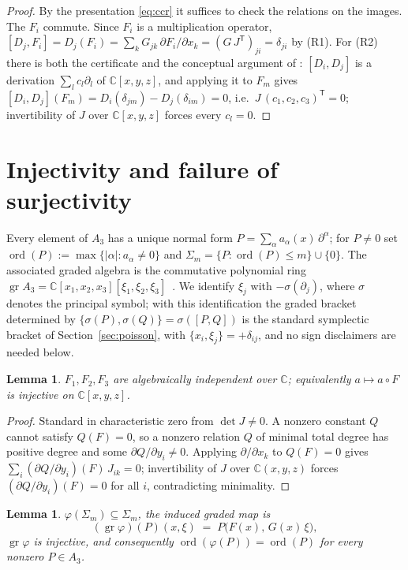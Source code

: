 \documentclass[11pt]{article}
\newtheorem{lemma}[theorem]{Lemma}
\theoremstyle{remark}
\newcommand{\C}{\mathbb{C}}
\newcommand{\A}{A_3}
\newcommand{\ord}{\operatorname{ord}}
\newcommand{\gr}{\operatorname{gr}}
\begin{document}
\begin{proof}
By the presentation \eqref{eq:ccr} it suffices to check the relations on
the images. The $F_i$ commute. Since $F_i$ is a multiplication operator,
$[D_j,F_i]=D_j(F_i)=\sum_k G_{jk}\,\partial F_i/\partial x_k=(G\,J^{\mathsf
T})_{ji}=\delta_{ji}$ by (R1). For (R2) there is both the certificate and
the conceptual argument of \cite[Prop.~3]{OP2026}: $[D_i,D_j]$ is a
derivation $\sum_l c_l\partial_l$ of $\C[x,y,z]$, and applying it to $F_m$
gives $[D_i,D_j](F_m)=D_i(\delta_{jm})-D_j(\delta_{im})=0$, i.e.\
$J\,(c_1,c_2,c_3)^{\mathsf T}=0$; invertibility of $J$ over $\C[x,y,z]$
forces every $c_l=0$.
\end{proof}

\section{Injectivity and failure of surjectivity}\label{sec:nonsurj}

Every element of $\A$ has a unique normal form $P=\sum_\alpha
a_\alpha(x)\,\partial^\alpha$; for $P\neq0$ set $\ord(P) := \max\{|\alpha| :
a_\alpha\neq0\}$ and $\Sigma_m=\{P:\ord(P)\le m\}\cup\{0\}$. The associated
graded algebra is the commutative polynomial ring
$\gr\A=\C[x_1,x_2,x_3][\xi_1,\xi_2,\xi_3]$~\cite[Ch.~2--3]{Coutinho1995}.
We identify $\xi_j$ with $-\sigma(\partial_j)$, where $\sigma$ denotes the
principal symbol; with this identification the graded bracket determined
by $\{\sigma(P),\sigma(Q)\}=\sigma([P,Q])$ is the standard symplectic
bracket of Section~\ref{sec:poisson}, with $\{x_i,\xi_j\}=+\delta_{ij}$,
and no sign disclaimers are needed below.

\begin{lemma}\label{lem:algind}
$F_1,F_2,F_3$ are algebraically independent over $\C$; equivalently
$a\mapsto a\circ F$ is injective on $\C[x,y,z]$.
\end{lemma}

\begin{proof}
Standard in characteristic zero from $\det J\ne 0$. A nonzero constant $Q$
cannot satisfy $Q(F)=0$, so a nonzero relation $Q$ of minimal total degree
has positive degree and some $\partial Q/\partial y_i\ne0$. Applying
$\partial/\partial x_k$ to $Q(F)=0$ gives $\sum_i (\partial Q/\partial
y_i)(F)\, J_{ik}=0$; invertibility of $J$ over $\C(x,y,z)$ forces
$(\partial Q/\partial y_i)(F)=0$ for all $i$, contradicting minimality.
\end{proof}

\begin{lemma}\label{lem:filtration}
$\varphi(\Sigma_m)\subseteq\Sigma_m$, the induced graded map is
\[
(\gr\varphi)(P)(x,\xi) \;=\; P\bigl(F(x),\, G(x)\,\xi\bigr),
\]
$\gr\varphi$ is injective, and consequently
$\ord(\varphi(P))=\ord(P)$ for every nonzero $P\in\A$.
\end{lemma}
\end{document}
